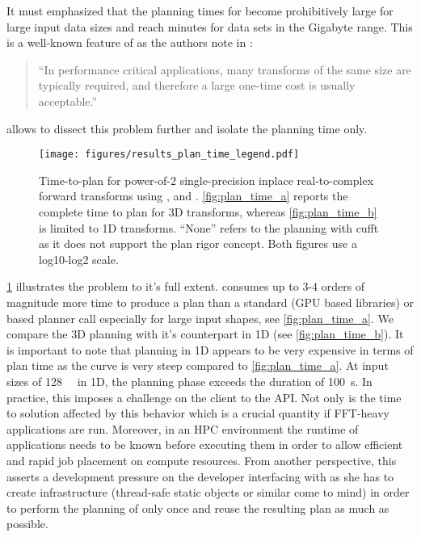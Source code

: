 It must emphasized that the planning times for  become prohibitively large for large input data sizes and reach minutes for data sets in the Gigabyte range. This is a well-known feature of \fftw{} as the authors note in \cite{FFTW05}:
%
\begin{quote}
  ``In performance critical applications, many transforms of the same
  size are typically required, and therefore a large one-time cost is
  usually acceptable.''
\end{quote}
% 
\gearshifft{} allows to dissect this problem further and isolate the planning time only.
%
\begin{figure}[!tbp]
  \centering
  \texttt{[image: figures/results\_plan\_time\_legend.pdf]}\vspace{-1em}
  \hfill
  \caption{Time-to-plan for power-of-2 single-precision inplace real-to-complex forward transforms using \fftw{}, \cufft{} and \clfft{}. \cref{fig:plan_time_a} reports the complete time to plan for 3D transforms, whereas \cref{fig:plan_time_b} is limited to 1D transforms. ``None'' refers to the planning with cufft as it does not support the plan rigor concept. Both figures use a log10-log2 scale.}
  \label{fig:plan_time}
\end{figure}
%
\cref{fig:plan_time} illustrates the problem to it's full extent.  consumes up to 3-4 orders of magnitude more time to produce a plan than a standard (GPU based libraries) or  based planner call especially for large input shapes, see \cref{fig:plan_time_a}. We compare the 3D planning with it's counterpart in 1D (see \cref{fig:plan_time_b}). It is important to note that \fftw{} planning in 1D appears to be very expensive in terms of plan time as the  curve is very steep compared to \cref{fig:plan_time_a}. At input sizes of \SI{128}{\mebi\byte} in 1D, the planning phase exceeds the duration of \SI{100}{\second}. In practice, this imposes a challenge on the client to the \fftw{} API. Not only is the time to solution affected by this behavior which is a crucial quantity if FFT-heavy applications are run. Moreover, in an HPC environment the runtime of applications needs to be known before executing them in order to allow efficient and rapid job placement on compute resources. From another perspective, this asserts a development pressure on the developer interfacing with \fftw{} as she has to create infrastructure (thread-safe static objects or similar come to mind) in order to perform the planning of \fftw{} only once and reuse the resulting plan as much as possible.

